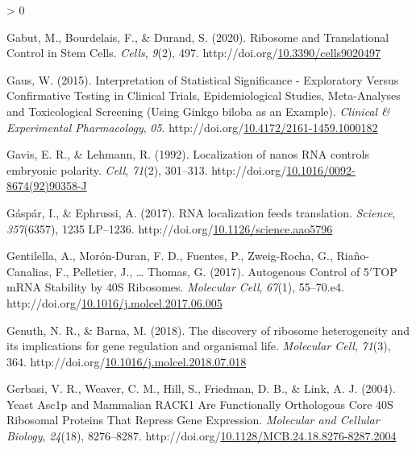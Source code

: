 \documentclass[12pt,oneside]{reedthesis}
\newlength{\cslhangindent}
\newenvironment{CSLReferences}[2] %
 {%
  \setlength{\parindent}{0pt}
  \ifodd #1 \everypar{\setlength{\hangindent}{\cslhangindent}}\ignorespaces\fi
  \ifnum #2 > 0
  \setlength{\parskip}{#2\baselineskip}
  \fi
 }%
 {}
\begin{document}
\begin{CSLReferences}{1}{0}
\leavevmode\hypertarget{ref-gabutRibosomeTranslationalControl2020}{}%
Gabut, M., Bourdelais, F., \& Durand, S. (2020). Ribosome and {Translational Control} in {Stem Cells}. \emph{Cells}, \emph{9}(2), 497. http://doi.org/\href{https://doi.org/10.3390/cells9020497}{10.3390/cells9020497}

\leavevmode\hypertarget{ref-gausInterpretationStatisticalSignificance2015}{}%
Gaus, W. (2015). Interpretation of {Statistical Significance} - {Exploratory Versus Confirmative Testing} in {Clinical Trials}, {Epidemiological Studies}, {Meta-Analyses} and {Toxicological Screening} ({Using Ginkgo} biloba as an {Example}). \emph{Clinical \& Experimental Pharmacology}, \emph{05}. http://doi.org/\href{https://doi.org/10.4172/2161-1459.1000182}{10.4172/2161-1459.1000182}

\leavevmode\hypertarget{ref-gavisLocalizationNanosRNA1992}{}%
Gavis, E. R., \& Lehmann, R. (1992). Localization of nanos {RNA} controls embryonic polarity. \emph{Cell}, \emph{71}(2), 301--313. http://doi.org/\href{https://doi.org/10.1016/0092-8674(92)90358-J}{10.1016/0092-8674(92)90358-J}

\leavevmode\hypertarget{ref-Gaspar2017b}{}%
Gáspár, I., \& Ephrussi, A. (2017). {RNA} localization feeds translation. \emph{Science}, \emph{357}(6357), 1235 LP--1236. http://doi.org/\href{https://doi.org/10.1126/science.aao5796}{10.1126/science.aao5796}

\leavevmode\hypertarget{ref-gentilellaAutogenousControlTOP2017}{}%
Gentilella, A., Morón-Duran, F. D., Fuentes, P., Zweig-Rocha, G., Riaño-Canalias, F., Pelletier, J., \ldots{} Thomas, G. (2017). Autogenous {Control} of 5{\({'}\)}{TOP mRNA Stability} by {40S Ribosomes}. \emph{Molecular Cell}, \emph{67}(1), 55--70.e4. http://doi.org/\href{https://doi.org/10.1016/j.molcel.2017.06.005}{10.1016/j.molcel.2017.06.005}

\leavevmode\hypertarget{ref-genuthDiscoveryRibosomeHeterogeneity2018}{}%
Genuth, N. R., \& Barna, M. (2018). The discovery of ribosome heterogeneity and its implications for gene regulation and organismal life. \emph{Molecular Cell}, \emph{71}(3), 364. http://doi.org/\href{https://doi.org/10.1016/j.molcel.2018.07.018}{10.1016/j.molcel.2018.07.018}

\leavevmode\hypertarget{ref-gerbasiYeastAsc1pMammalian2004}{}%
Gerbasi, V. R., Weaver, C. M., Hill, S., Friedman, D. B., \& Link, A. J. (2004). Yeast {Asc1p} and {Mammalian RACK1 Are Functionally Orthologous Core 40S Ribosomal Proteins That Repress Gene Expression}. \emph{Molecular and Cellular Biology}, \emph{24}(18), 8276--8287. http://doi.org/\href{https://doi.org/10.1128/MCB.24.18.8276-8287.2004}{10.1128/MCB.24.18.8276-8287.2004}


\end{CSLReferences}
\end{document}
